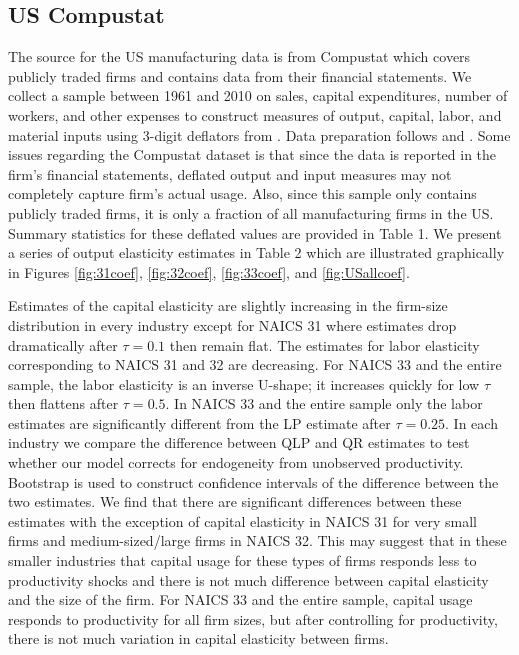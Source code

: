 \documentclass[11pt]{article}
\begin{document}
\subsection{US Compustat}
The source for the US manufacturing data is from Compustat which covers publicly traded firms and contains data from their financial statements. We collect a sample between 1961 and 2010 on sales, capital expenditures, number of workers, and other expenses to construct measures of output, capital, labor, and material inputs using 3-digit deflators from \cite{nber}. Data preparation follows \cite{Keller2009} and \cite{mert}. Some issues regarding the Compustat dataset is that since the data is reported in the firm's financial statements, deflated output and input measures may not completely capture firm's actual usage. Also, since this sample only contains publicly traded firms, it is only a fraction of all manufacturing firms in the US. Summary statistics for these deflated values are provided in Table 1. We present a series of output elasticity estimates in Table 2 which are illustrated graphically in Figures \ref{fig:31coef}, \ref{fig:32coef}, \ref{fig:33coef}, and \ref{fig:USallcoef}.
 

\label{Tab:USsummary}
Estimates of the capital elasticity are slightly increasing in the firm-size distribution in every industry except for NAICS 31 where estimates drop dramatically after $\tau=0.1$ then remain flat. The estimates for labor elasticity corresponding to NAICS 31 and 32 are decreasing. For NAICS 33 and the entire sample, the labor elasticity is an inverse U-shape; it increases quickly for low $\tau$ then flattens after $\tau=0.5$. In NAICS 33 and the entire sample only the labor estimates are significantly different from the LP estimate after $\tau=0.25$. In each industry we compare the difference between QLP and QR estimates to test whether our model corrects for endogeneity from unobserved productivity. Bootstrap is used to construct confidence intervals of the difference between the two estimates. We find that there are significant differences between these estimates with the exception of capital elasticity in NAICS 31 for very small firms and medium-sized/large firms in NAICS 32. This may suggest that in these smaller industries that capital usage for these types of firms responds less to productivity shocks and there is not much difference between capital elasticity and the size of the firm. For NAICS 33 and the entire sample, capital usage responds to productivity for all firm sizes, but after controlling for productivity, there is not much variation in capital elasticity between firms.\\
\end{document}
